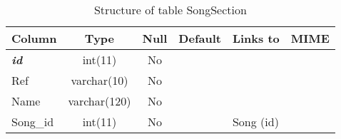 \documentclass[10pt,a4paper,oneside,notitlepage]{article}
\begin{document}
%
%
 \begin{longtable}{|l|c|c|c|l|l|} 
 \caption{Structure of table SongSection} \label{tab:SongSection-structure} \\
 \hline \multicolumn{1}{|c|}{\textbf{Column}} & \multicolumn{1}{|c|}{\textbf{Type}} & \multicolumn{1}{|c|}{\textbf{Null}} & \multicolumn{1}{|c|}{\textbf{Default}} & \multicolumn{1}{|c|}{\textbf{Links to}} & \multicolumn{1}{|c|}{\textbf{MIME}} \\ \hline \hline
\textbf{\textit{id}} & int(11) & No &  &  &  \\ \hline 
Ref & varchar(10) & No &  &  &  \\ \hline 
Name & varchar(120) & No &  &  &  \\ \hline 
Song\_id & int(11) & No &  & Song (id) &  \\ \hline 
 \end{longtable}
\end{document}
